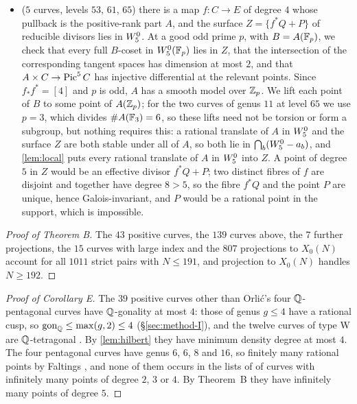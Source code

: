 \begin{itemize}
 positive-dimensional translate in $\W$ with dense rational points has the form $x+A$ with $x$ rational; its
 reduction modulo $2$ contains the full coset $\bar x+A(\F_2)$, of order $5$, in $\W(\F_2)$. The set $\W(\F_2)$ has
 $2133$ elements, and $J(\F_2)\cong\Z/38\times\Z/1330$ has a unique subgroup of order $5$, which is therefore
 $A(\F_2)$; no coset of it lies in $\W(\F_2)$. So $\W(\Q)$ is finite;
\item[F] ($5$ curves, levels $53$, $61$, $65$) there is a map $f\colon C\to E$ of degree $4$ whose pullback is
 the positive-rank part $A$, and the surface $Z=\{f^*Q+P\}$ of reducible divisors lies in $\W$. At a good odd
 prime $p$, with $B=A(\mathbb{F}_p)$, we check that every full $B$-coset in $W^0_5(\mathbb{F}_p)$ lies in $Z$, that the intersection
 of the corresponding tangent spaces has dimension at most $2$, and that $A\times C\to\operatorname{Pic}^5C$ has injective
 differential at the relevant points. Since $f_*f^*=[4]$ and $p$ is odd, $A$ has a smooth model over $\mathbb{Z}_p$.
 We lift each point of $B$ to some point of $A(\mathbb{Z}_p)$; for the two curves of genus $11$ at level $65$ we use $p=3$,
 which divides $\#A(\mathbb{F}_3)=6$, so these lifts need not be torsion or form a subgroup, but nothing requires this: a
 rational translate of $A$ in $\W$ and the surface $Z$ are both stable under all of $A$, so both lie in
 $\bigcap_b(W^0_5-a_b)$, and \cref{lem:local} puts every rational translate of $A$ in $\W$ into $Z$.
 A point of degree $5$ in $Z$ would be an effective divisor $f^*Q+P$; two distinct fibres of $f$ are disjoint and
 together have degree $8>5$, so the fibre $f^*Q$ and the point $P$ are unique, hence Galois-invariant, and $P$ would be a
 rational point in the support, which is impossible.
\end{itemize}

\begin{proof}[Proof of Theorem B]
The $43$ positive curves, the $139$ curves above, the $7$ further projections, the $15$ curves with large index
and the $807$ projections to $X_0(N)$ account for all $1011$ strict pairs with $N\le191$, and projection to
$X_0(N)$ handles $N\ge192$.
\end{proof}

\begin{proof}[Proof of Corollary E]
The $39$ positive curves other than Orli\'c's four $\mathbb{Q}$-pentagonal curves have $\mathbb{Q}$-gonality at most $4$: those
of genus $g\le4$ have a rational cusp, so $\operatorname{gon}_{\mathbb{Q}}\le\max(g,2)\le4$ (\S\ref{sec:method-I}), and the twelve
curves of type W are $\mathbb{Q}$-tetragonal \cite[Theorem~1.3]{Orlic2025}. By \cref{lem:hilbert} they have minimum density degree at most $4$. The four
pentagonal curves have genus $6$, $6$, $8$ and $16$, so finitely many rational points by Faltings
\cite{Faltings1991}, and none of them occurs in the lists of \cite[Theorems~1.4, 1.5 and~1.6]{DerickxOrlic2026}
of curves with infinitely many points of degree $2$, $3$ or $4$. By Theorem~B they have infinitely many points
of degree $5$.
\end{proof}

